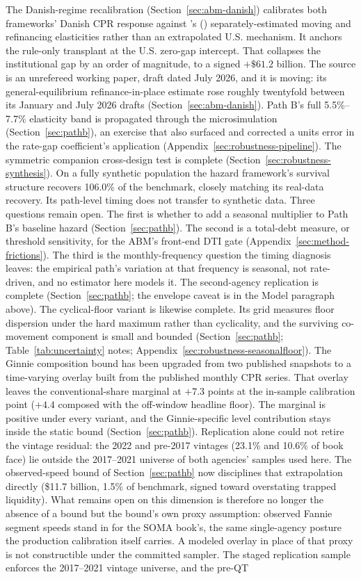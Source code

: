 \documentclass[12pt]{article}
\newcommand{\citepos}[1]{\citeauthor{#1}'s (\citeyear{#1})}
\begin{document}
The Danish-regime recalibration (Section~\ref{sec:abm-danish}) calibrates both frameworks' Danish CPR response against \citepos{berger2026} separately-estimated moving and refinancing elasticities rather than an extrapolated U.S. mechanism. It anchors the rule-only transplant at the U.S. zero-gap intercept. That collapses the institutional gap by an order of magnitude, to a signed $+\$61.2$ billion. The source is an unrefereed working paper, draft dated July 2026, and it is moving: its general-equilibrium refinance-in-place estimate rose roughly twentyfold between its January and July 2026 drafts (Section~\ref{sec:abm-danish}). Path B's full 5.5\%--7.7\% elasticity band is propagated through the microsimulation (Section~\ref{sec:pathb}), an exercise that also surfaced and corrected a units error in the rate-gap coefficient's application (Appendix~\ref{sec:robustness-pipeline}). The symmetric companion cross-design test is complete (Section~\ref{sec:robustness-synthesis}). On a fully synthetic population the hazard framework's survival structure recovers 106.0\% of the benchmark, closely matching its real-data recovery. Its path-level timing does not transfer to synthetic data. Three questions remain open. The first is whether to add a seasonal multiplier to Path B's baseline hazard (Section~\ref{sec:pathb}). The second is a total-debt measure, or threshold sensitivity, for the ABM's front-end DTI gate (Appendix~\ref{sec:method-frictions}). The third is the monthly-frequency question the timing diagnosis leaves: the empirical path's variation at that frequency is seasonal, not rate-driven, and no estimator here models it. The second-agency replication is complete (Section~\ref{sec:pathb}; the envelope caveat is in the Model paragraph above). The cyclical-floor variant is likewise complete. Its grid measures floor dispersion under the hard maximum rather than cyclicality, and the surviving co-movement component is small and bounded (Section~\ref{sec:pathb}; Table~\ref{tab:uncertainty} notes; Appendix~\ref{sec:robustness-seasonalfloor}). The Ginnie composition bound has been upgraded from two published snapshots to a time-varying overlay built from the published monthly CPR series. That overlay leaves the conventional-share marginal at $+7.3$ points at the in-sample calibration point ($+4.4$ composed with the off-window headline floor). The marginal is positive under every variant, and the Ginnie-specific level contribution stays inside the static bound (Section~\ref{sec:pathb}). Replication alone could not retire the vintage residual: the 2022 and pre-2017 vintages (23.1\% and 10.6\% of book face) lie outside the 2017--2021 universe of both agencies' samples used here. The observed-speed bound of Section~\ref{sec:pathb} now disciplines that extrapolation directly (\$11.7 billion, 1.5\% of benchmark, signed toward overstating trapped liquidity). What remains open on this dimension is therefore no longer the absence of a bound but the bound's own proxy assumption: observed Fannie segment speeds stand in for the SOMA book's, the same single-agency posture the production calibration itself carries. A modeled overlay in place of that proxy is not constructible under the committed sampler. The staged replication sample enforces the 2017--2021 vintage universe, and the pre-QT 
\end{document}
